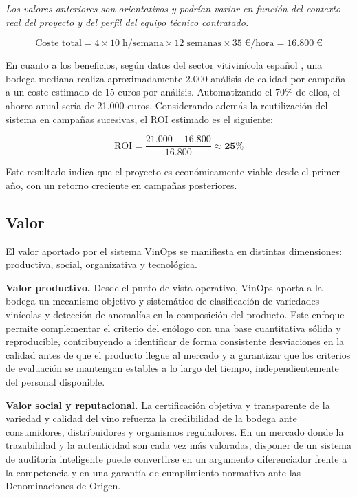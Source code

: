 \textit{Los valores anteriores son orientativos y podrían variar 
en función del contexto real del proyecto y del perfil del equipo 
técnico contratado.}

\[
\text{Coste total} = 4 \times 10 \; \text{h/semana} \times 
12 \; \text{semanas} \times 35 \; \text{€/hora} = 16{.}800 \; \text{€}
\]

En cuanto a los beneficios, según datos del sector vitivinícola 
español \cite{OEMV2022}, una bodega mediana realiza aproximadamente 
2.000 análisis de calidad por campaña a un coste estimado de 15 euros 
por análisis. Automatizando el 70\% de ellos, el ahorro anual sería de 
21.000 euros. Considerando además la reutilización del sistema en 
campañas sucesivas, el ROI estimado es el siguiente:

\[
\text{ROI} = \frac{21{.}000 - 16{.}800}{16{.}800} \approx \mathbf{25\%}
\]

Este resultado indica que el proyecto es económicamente viable desde el 
primer año, con un retorno creciente en campañas posteriores.


\subsection{Valor}

El valor aportado por el sistema VinOps se manifiesta en distintas dimensiones: 
productiva, social, organizativa y tecnológica.

\textbf{Valor productivo.} Desde el punto de vista operativo, VinOps aporta a 
la bodega un mecanismo objetivo y sistemático de clasificación de variedades vinícolas 
y detección de anomalías en la composición del producto. Este enfoque permite 
complementar el criterio del enólogo con una base cuantitativa sólida y reproducible, 
contribuyendo a identificar de forma consistente desviaciones en la calidad antes de 
que el producto llegue al mercado y a garantizar que los criterios de evaluación se 
mantengan estables a lo largo del tiempo, independientemente del personal disponible.

\textbf{Valor social y reputacional.} La certificación objetiva y transparente de la 
variedad y calidad del vino refuerza la credibilidad de la bodega ante consumidores, 
distribuidores y organismos reguladores. En un mercado donde la trazabilidad y la 
autenticidad son cada vez más valoradas, disponer de un sistema de auditoría inteligente 
puede convertirse en un argumento diferenciador frente a la competencia y en una garantía 
de cumplimiento normativo ante las Denominaciones de Origen.

